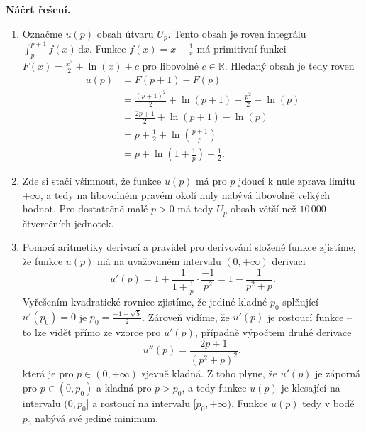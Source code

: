 \medskip
\noindent\textbf{Náčrt řešení.}\par
\begin{enumerate}
  \item Označme $u(p)$ obsah útvaru $U_p$. Tento obsah je roven integrálu $\int_p^{p+1} f(x)\,\mathrm{d}x$. Funkce $f(x) = x + \frac{1}{x}$ má primitivní funkci $F(x) = \frac{x^2}{2} + \ln(x) + c$ pro libovolné $c \in \mathbb{R}$. Hledaný obsah je tedy roven
    \begin{align*}
      u(p) &= F(p + 1) - F(p) \\
           &= \frac{(p + 1)^2}{2} + \ln(p + 1) - \frac{p^2}{2} - \ln(p) \\
           &= \frac{2p + 1}{2} + \ln(p + 1) - \ln(p) \\
           &= p + \frac{1}{2} + \ln\!\left(\frac{p + 1}{p}\right) \\
           &= p + \ln\!\left(1 + \frac{1}{p}\right) + \frac{1}{2}.
    \end{align*}
  \item Zde si stačí všimnout, že funkce $u(p)$ má pro $p$ jdoucí k nule zprava limitu $+\infty$, a tedy na libovolném pravém okolí nuly nabývá libovolně velkých hodnot. Pro dostatečně malé $p > 0$ má tedy $U_p$ obsah větší než $10\,000$ čtverečních jednotek.
  \item Pomocí aritmetiky derivací a pravidel pro derivování složené funkce zjistíme, že funkce $u(p)$ má na uvažovaném intervalu $(0, +\infty)$ derivaci
    \[
      u'(p) = 1 + \frac{1}{1 + \frac{1}{p}} \cdot \frac{-1}{p^2} = 1 - \frac{1}{p^2 + p}.
    \]
    Vyřešením kvadratické rovnice zjistíme, že jediné kladné $p_0$ splňující $u'(p_0) = 0$ je $p_0 = \frac{-1 + \sqrt{5}}{2}$. Zároveň vidíme, že $u'(p)$ je rostoucí funkce -- to lze vidět přímo ze vzorce pro $u'(p)$, případně výpočtem druhé derivace
    \[
      u''(p) = \frac{2p + 1}{(p^2 + p)^2},
    \]
    která je pro $p \in (0, +\infty)$ zjevně kladná. Z toho plyne, že $u'(p)$ je záporná pro $p \in (0, p_0)$ a kladná pro $p > p_0$, a tedy funkce $u(p)$ je klesající na intervalu $(0, p_0]$ a rostoucí na intervalu $[p_0, +\infty)$. Funkce $u(p)$ tedy v bodě $p_0$ nabývá své jediné minimum.
\end{enumerate}
